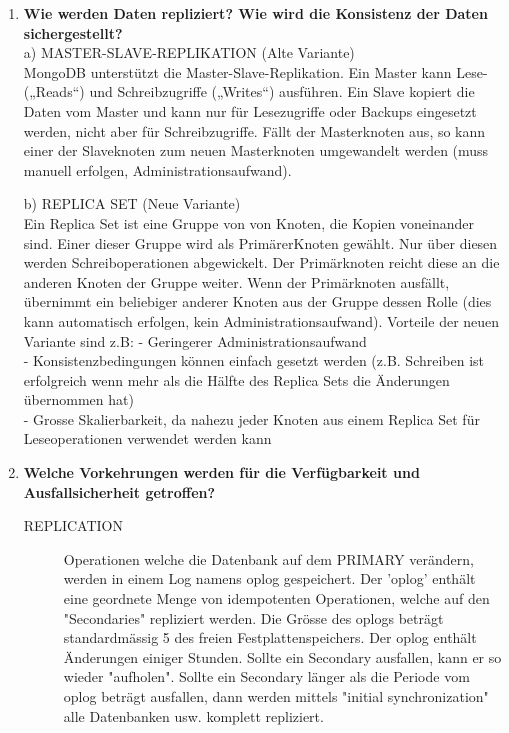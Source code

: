 \documentclass[a4paper,10pt,titlepage=false]{scrreprt}
\newcommand{\pic}[2][figure]{\begin{figure}[h]
 \centering
 \texttt{[image: \#2]}
 \caption{#1}
\end{figure}
}
\begin{document}
\begin{enumerate}
\begin{itemize}
\item Jedes Dokument in der gleichen Sammlung kann verschiedene Felder haben.
\item Das Format wird BSON genannt und ist ähnlich wie JSON, jedoch in binärer Form damit es schneller Verarbeitet werden kann.
\item \pic{mdbapi.png}
\item \pic{mdbapi2.png}
\item \pic{mdbapiextra.png}
\item \pic{mdbsh.png}
  \end{itemize}
\item \textbf{Wie werden Daten repliziert? Wie wird die Konsistenz der Daten sichergestellt?}\\
a) MASTER-SLAVE-REPLIKATION (Alte Variante)\\
MongoDB unterstützt die Master-Slave-Replikation. Ein Master kann Lese- („Reads“) und Schreibzugriffe („Writes“) ausführen. Ein Slave kopiert die Daten vom Master und kann nur für Lesezugriffe oder Backups eingesetzt werden, nicht aber für Schreibzugriffe. Fällt der Masterknoten aus, so kann einer der Slaveknoten zum neuen Masterknoten umgewandelt werden (muss manuell erfolgen, Administrationsaufwand).

b) REPLICA SET (Neue Variante)\\
Ein Replica Set ist eine Gruppe von von Knoten, die Kopien voneinander sind. Einer dieser Gruppe wird als PrimärerKnoten gewählt. Nur über diesen werden Schreiboperationen abgewickelt. Der Primärknoten reicht diese an die anderen Knoten der Gruppe weiter. Wenn der Primärknoten ausfällt, übernimmt ein beliebiger anderer Knoten aus der Gruppe dessen Rolle (dies kann automatisch erfolgen, kein Administrationsaufwand). Vorteile der neuen Variante sind z.B:
- Geringerer Administrationsaufwand\\
- Konsistenzbedingungen können einfach gesetzt werden (z.B. Schreiben ist erfolgreich wenn mehr als die Hälfte des Replica Sets die Änderungen übernommen hat)\\
- Grosse Skalierbarkeit, da nahezu jeder Knoten aus einem Replica Set für Leseoperationen verwendet werden kann\\
\item \textbf{Welche Vorkehrungen werden für die Verfügbarkeit und Ausfallsicherheit getroffen?} \\
\begin{description}
\item[REPLICATION]
Operationen welche die Datenbank auf dem PRIMARY verändern, werden in einem Log namens
oplog gespeichert. Der 'oplog' enthält eine geordnete Menge von idempotenten Operationen,
welche auf den "Secondaries" repliziert werden. Die Grösse des oplogs beträgt standardmässig 5%
des freien Festplattenspeichers. Der oplog enthält Änderungen einiger Stunden.
Sollte ein Secondary ausfallen, kann er so wieder "aufholen". Sollte ein Secondary länger als
die Periode vom oplog beträgt ausfallen, dann werden mittels "initial synchronization" alle Datenbanken usw. komplett
repliziert.


\end{description}
\end{enumerate}
\end{document}
